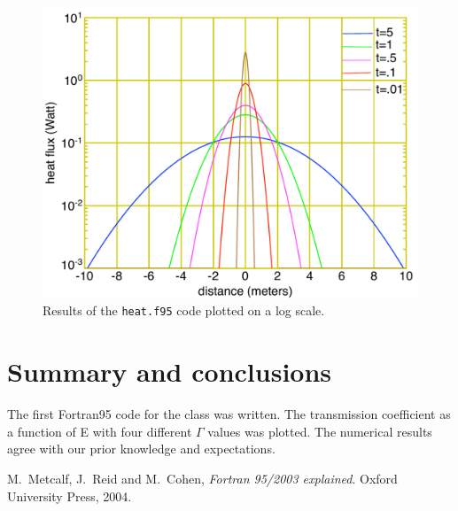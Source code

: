 \documentclass[12pt]{article}
\begin{document}
\begin{figure}[!htb]
\includegraphics[width=1.\textwidth]{stufflog.pdf}
\caption{Results of the {\tt heat.f95} code plotted on a log scale. }
\label{logscattering}
\end{figure}





\section{Summary and conclusions}

The first Fortran95 code \cite{metcalf} for the class was written. The transmission coefficient as a function of E with four different $\Gamma$ values was plotted. The numerical results agree with our prior knowledge and expectations.

\begin{thebibliography}{}


 M.\ Metcalf, J.\ Reid and M.\ Cohen, {\it Fortran 95/2003 explained}. Oxford University Press, 2004.
 

\end{thebibliography}
\end{document}
